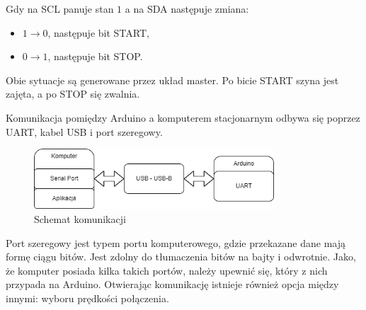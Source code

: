 Gdy na SCL panuje stan $1$ a na SDA następuje zmiana:

\begin{itemize}
    \item $1 \rightarrow 0$, następuje bit START,
    \item $0 \rightarrow 1$, następuje bit STOP.
\end{itemize}

Obie sytuacje są generowane przez układ master. Po bicie START szyna jest zajęta, a po STOP się zwalnia.

Komunikacja pomiędzy Arduino a komputerem stacjonarnym odbywa się poprzez UART, kabel USB i port szeregowy.

\begin{figure}[H]
    \centering
    \includegraphics[width=0.8\textwidth]{pictures/serialPort.png}
    \caption{Schemat komunikacji}
    \label{fig:sp}
\end{figure}

Port szeregowy jest typem portu komputerowego, gdzie przekazane dane mają formę ciągu bitów. Jest zdolny do tłumaczenia bitów na bajty i odwrotnie. Jako, że komputer posiada kilka takich portów, należy upewnić się, który z nich przypada na Arduino. Otwierając komunikację istnieje również opcja między innymi: wyboru prędkości połączenia.